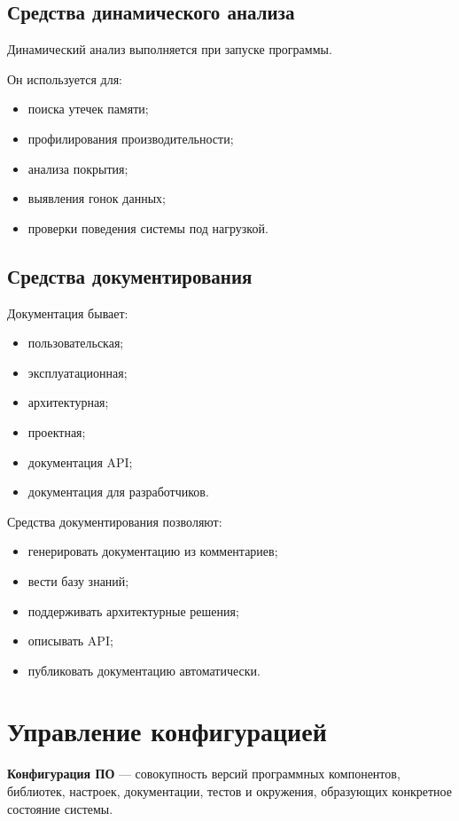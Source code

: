 \documentclass[12pt,a4paper]{article}
\begin{document}
\subsection{Средства динамического анализа}

Динамический анализ выполняется при запуске программы.

Он используется для:
\begin{itemize}
    \item поиска утечек памяти;
    \item профилирования производительности;
    \item анализа покрытия;
    \item выявления гонок данных;
    \item проверки поведения системы под нагрузкой.
\end{itemize}

\subsection{Средства документирования}

Документация бывает:
\begin{itemize}
    \item пользовательская;
    \item эксплуатационная;
    \item архитектурная;
    \item проектная;
    \item документация API;
    \item документация для разработчиков.
\end{itemize}

Средства документирования позволяют:
\begin{itemize}
    \item генерировать документацию из комментариев;
    \item вести базу знаний;
    \item поддерживать архитектурные решения;
    \item описывать API;
    \item публиковать документацию автоматически.
\end{itemize}

\section{Управление конфигурацией}

\textbf{Конфигурация ПО} --- совокупность версий программных компонентов, библиотек, настроек, документации, тестов и окружения, образующих конкретное состояние системы.
\end{document}
